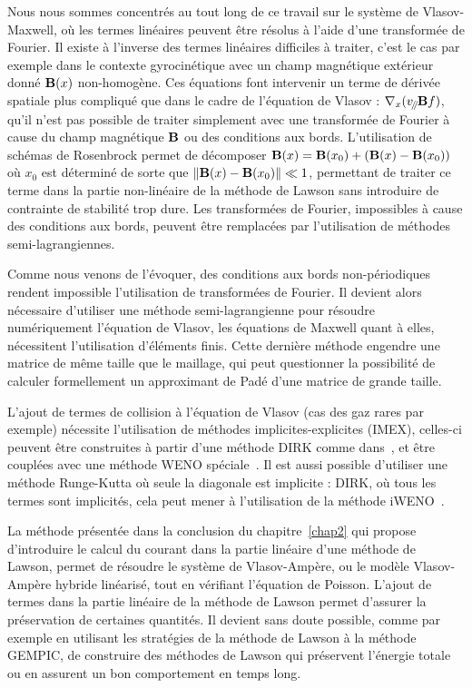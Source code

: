 Nous nous sommes concentrés au tout long de ce travail sur le système de Vlasov-Maxwell, où les termes linéaires peuvent être résolus à l'aide d'une transformée de Fourier. Il existe à l'inverse des termes linéaires difficiles à traiter, c'est le cas par exemple dans le contexte gyrocinétique avec un champ magnétique extérieur donné $\vb{B}(x)$ non-homogène. Ces équations font intervenir un terme de dérivée spatiale plus compliqué que dans le cadre de l'équation de Vlasov : $\nabla_{x}(v_{\mathbin{\!/\mkern-5mu/\!}}\vb{B}f)$, qu'il n'est pas possible de traiter simplement avec une transformée de Fourier à cause du champ magnétique $\vb{B}$ ou des conditions aux bords. L'utilisation de schémas de Rosenbrock permet de décomposer $\vb{B}(x) = \vb{B}(x_0) + ( \vb{B}(x)-\vb{B}(x_0) )$ où $x_0$ est déterminé de sorte que $\|\vb{B}(x)-\vb{B}(x_0)\| \ll 1$, permettant de traiter ce terme dans la partie non-linéaire de la méthode de Lawson sans introduire de contrainte de stabilité trop dure. Les transformées de Fourier, impossibles à cause des conditions aux bords, peuvent être remplacées par l'utilisation de méthodes semi-lagrangiennes.


Comme nous venons de l'évoquer, des conditions aux bords non-périodiques rendent impossible l'utilisation de transformées de Fourier. Il devient alors nécessaire d'utiliser une méthode semi-lagrangienne pour résoudre numériquement l'équation de Vlasov, les équations de Maxwell quant à elles, nécessitent l'utilisation d'éléments finis. Cette dernière méthode engendre une matrice de même taille que le maillage, qui peut questionner la possibilité de calculer formellement un approximant de Padé d'une matrice de grande taille.

L'ajout de termes de collision à l'équation de Vlasov (cas des gaz rares par exemple) nécessite l'utilisation de méthodes implicites-explicites (IMEX), celles-ci peuvent être construites à partir d'une méthode DIRK comme dans~\cite{Cho:2021}, et être couplées avec une méthode WENO spéciale~\cite{Boscarino:2019}. Il est aussi possible d'utiliser une méthode Runge-Kutta où seule la diagonale est implicite : DIRK, où tous les termes sont implicités, cela peut mener à l'utilisation de la méthode iWENO~\cite{Gottlieb:2006}.

La méthode présentée dans la conclusion du chapitre~\ref{chap2} qui propose d'introduire le calcul du courant dans la partie linéaire d'une méthode de Lawson, permet de résoudre le système de Vlasov-Ampère, ou le modèle Vlasov-Ampère hybride linéarisé, tout en vérifiant l'équation de Poisson. L'ajout de termes dans la partie linéaire de la méthode de Lawson permet d'assurer la préservation de certaines quantités. Il devient sans doute possible, comme par exemple en utilisant les stratégies de la méthode de Lawson à la méthode GEMPIC, de construire des méthodes de Lawson qui préservent l'énergie totale ou en assurent un bon comportement en temps long.

